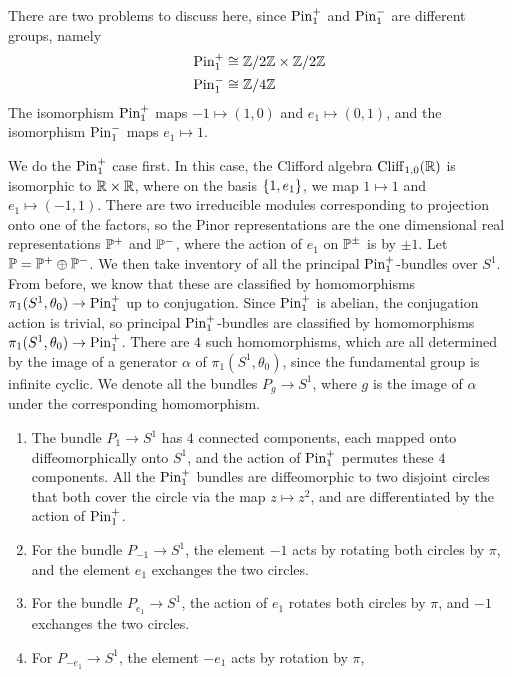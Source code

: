 \begin{exmp}
There are two problems to discuss here, since $\Pin_1^+$ and $\Pin_1^-$ are
different groups, namely
%
\begin{align*}
\Pin_1^+ &\cong \Z/2\Z \times \Z / 2\Z \\
\Pin_1^- &\cong \Z/4\Z
\end{align*}
The isomorphism $\Pin^+_1$ maps $-1 \mapsto (1,0)$ and $e_1 \mapsto (0,1)$,
and the isomorphism $\Pin^-_1$ maps $e_1 \mapsto 1$.
%

We do the $\Pin_1^+$ case first. In this case, the Clifford algebra
$\Cliff_{1,0}(\R)$ is isomorphic to $\R \times \R$, where on the basis $\set{1,e_1}$,
we map $1\mapsto 1$ and $e_1 \mapsto (-1,1)$. There are two irreducible
modules corresponding
to projection onto one of the factors, so the Pinor representations are the one
dimensional real representations $\P^+$ and $\P^-$, where the action of $e_1$ on
$\P^\pm$ is by $\pm 1$. Let $\P = \P^+ \oplus \P^-$. We then take inventory
of all the principal $\Pin_1^+$-bundles over $S^1$. From before, we know that these
are classified by homomorphisms $\pi_1(S^1, \theta_0) \to \Pin_1^+$ up to
conjugation. Since $\Pin_1^+$ is abelian, the conjugation action is trivial,
so principal $\Pin_1^+$-bundles are classified by homomorphisms
$\pi_1(S^1,\theta_0) \to \Pin_1^+$. There are $4$ such homomorphisms,
which are all determined by the image of a generator $\alpha$ of $
\pi_1(S^1,\theta_0)$, since the fundamental group is infinite cyclic.
We denote all the bundles $P_g \to S^1$, where $g$ is the image of $\alpha$ under
the corresponding homomorphism.
%
\begin{enumerate}
  \item The bundle $P_1 \to S^1$ has $4$ connected components,
  each mapped onto diffeomorphically onto $S^1$, and the action of $\Pin_1^+$
  permutes these $4$ components. All the $\Pin_1^+$ bundles are diffeomorphic
  to two disjoint circles that both cover the circle via the map $z \mapsto z^2$,
  and are differentiated by the action of $\Pin_1^+$.
  \item For the bundle $P_{-1} \to S^1$, the element $-1$ acts by rotating both
  circles by $\pi$, and the element $e_1$ exchanges the two circles.
  \item For the bundle $P_{e_1} \to S^1$, the action of
  $e_1$ rotates both circles by $\pi$, and $-1$ exchanges the two circles.
  \item For $P_{-e_1} \to S^1$, the element $-e_1$ acts by rotation by $\pi$,

\end{enumerate}
\end{exmp}
